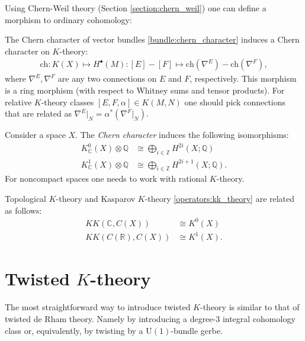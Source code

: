{    Using Chern-Weil theory (Section \ref{section:chern_weil}) one can define a morphism to ordinary cohomology:
    \begin{construct}\label{k:chern_character}
        The Chern character of vector bundles \ref{bundle:chern_character} induces a Chern character on $K$-theory:
        \begin{gather}
            \mathrm{ch}:K(X)\mapsto H^\bullet(M):[E]-[F]\mapsto \mathrm{ch}(\nabla^E)-\mathrm{ch}(\nabla^F),
        \end{gather}
        where $\nabla^E,\nabla^F$ are any two connections on $E$ and $F$, respectively. This morphism is a ring morphism (with respect to Whitney sums and tensor products). For relative $K$-theory classes $[E,F,\alpha]\in K(M,N)$ one should pick connections that are related as $\nabla^E|_N=\alpha^*(\nabla^F|_N)$.
    \end{construct}
    \begin{theorem}
        Consider a space $X$. The \textit{Chern character} induces the following isomorphisms:
        \begin{align}
            K^0_\mathbb{C}(X)\otimes\mathbb{Q}&\cong\bigoplus_{i\in\mathbb{Z}}H^{2i}(X;\mathbb{Q})\\
            K^1_\mathbb{C}(X)\otimes\mathbb{Q}&\cong\bigoplus_{i\in\mathbb{Z}}H^{2i+1}(X;\mathbb{Q}).
        \end{align}
        For noncompact spaces one needs to work with rational $K$-theory.
    \end{theorem}

    \begin{property}[$KK$-theory]\label{k:topological_kk_theory}
        Topological $K$-theory and Kasparov $K$-theory \ref{operators:kk_theory} are related as follows:
        \begin{align}
            KK(\mathbb{C},C(X))&\cong K^0(X)\\
            KK(C(\mathbb{R}),C(X))&\cong K^1(X).
        \end{align}
    \end{property}

\section{\texorpdfstring{Twisted $K$-theory}{Twisted K-theory}}

    The most straightforward way to introduce twisted $K$-theory is similar to that of twisted de Rham theory. Namely by introducing a degree-3 integral cohomology class or, equivalently, by twisting by a $\mathrm{U}(1)$-bundle gerbe.

}
